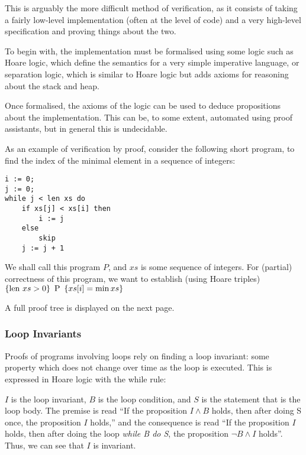 This is arguably the more difficult method of verification, as it
consists of taking a fairly low-level implementation (often at the
level of code) and a very high-level specification and proving things
about the two.

To begin with, the implementation must be formalised using some logic
such as Hoare logic\cite{Hoare69}, which define the semantics for a
very simple imperative language, or separation logic\cite{Reynolds02},
which is similar to Hoare logic but adds axioms for reasoning about
the stack and heap.

Once formalised, the axioms of the logic can be used to deduce
propositions about the implementation. This can be, to some extent,
automated using proof assistants, but in general this is undecidable.

As an example of verification by proof, consider the following short
program, to find the index of the minimal element in a sequence of
integers:

\begin{verbatim}
i := 0;
j := 0;
while j < len xs do
    if xs[j] < xs[i] then
        i := j
    else
        skip
    j := j + 1
\end{verbatim}

We shall call this program $P$, and $xs$ is some sequence of
integers. For (partial) correctness of this program, we want to
establish (using Hoare triples) $\htriple{\len xs > 0}{P}{xs[i] = \min
  xs}$

A full proof tree is displayed on the next page.

\subsubsection{Loop Invariants}

Proofs of programs involving loops rely on finding a loop invariant:
some property which does not change over time as the loop is
executed. This is expressed in Hoare logic with the while rule:

\begin{prooftree}
\end{prooftree}

$I$ is the loop invariant, $B$ is the loop condition, and $S$ is the
statement that is the loop body. The premise is read ``If the
proposition $I \land B$ holds, then after doing S once, the
proposition $I$ holds,'' and the consequence is read ``If the
proposition $I$ holds, then after doing the loop \textit{while B do
  S}, the proposition $\lnot B \land I$ holds''. Thus, we can see that
$I$ is invariant.


